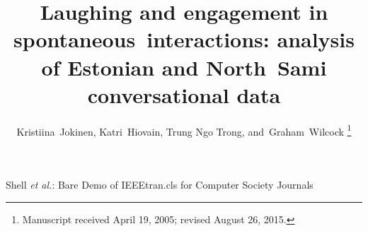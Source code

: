 \documentclass[10pt,journal,compsoc]{IEEEtran}
\begin{document}
\title{Laughing and engagement in spontaneous~interactions:
       analysis of Estonian and North~Sami conversational data}

\author{Kristiina~Jokinen, Katri~Hiovain, Trung Ngo Trong,
        and~Graham~Wilcock%
\thanks{Manuscript received April 19, 2005; revised August 26, 2015.}}

%
{Shell \MakeLowercase{\textit{et al.}}: Bare Demo of IEEEtran.cls for Computer Society Journals}
\end{document}
